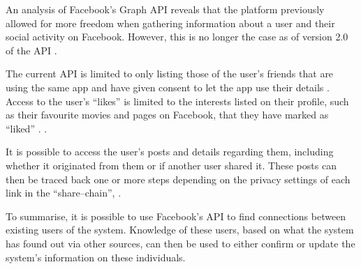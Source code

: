 An analysis of Facebook's Graph \ac{API} \citep{FacebookGraphApiDocumentation}
reveals that the platform previously allowed for more freedom when gathering
information about a user and their social activity on Facebook. However, this is
no longer the case as of version 2.0 of the \ac{API}
\citep{FacebookChangesInGraphTwoPointOh}.

The current \ac{API} is limited to only listing those of the user's friends
that are using the same app and have given consent to let the app use their
details \citep{FacebookChangesInGraphTwoPointOh}. Access to the user's ``likes''
is limited to the interests listed on their profile, such as their favourite
movies and pages on Facebook, that they have marked as ``liked''
\citep{FacebookGraphApiUserEdges, FacebookGraphApiUserLikes}.
.\nl

It is possible to access the user's posts and details regarding them, including
whether it originated from them or if another user shared it. These posts can
then be traced back one or more steps depending on the privacy settings of each
link in the ``share--chain'', .\nl

To summarise, it is possible to use Facebook's \ac{API} to find connections
between existing users of the system. Knowledge of these users, based on what
the system has found out via other sources, can then be used to either confirm
or update the system's information on these individuals.